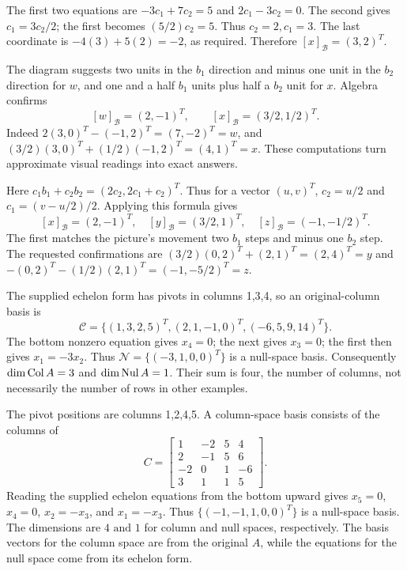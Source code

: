 The first two equations are $-3c_1+7c_2=5$ and $2c_1-3c_2=0$.
The second gives $c_1=3c_2/2$; the first becomes
$(5/2)c_2=5$. Thus $c_2=2,c_1=3$.
The last coordinate is $-4(3)+5(2)=-2$, as required.
Therefore $\boxed{[x]_{\mathcal B}=(3,2)^T}$.

The diagram suggests two units in the $b_1$ direction and minus one unit
in the $b_2$ direction for $w$, and one and a half $b_1$ units plus half
a $b_2$ unit for $x$. Algebra confirms
\[
 [w]_{\mathcal B}=(2,-1)^T,\qquad
 [x]_{\mathcal B}=(3/2,1/2)^T.
\]
Indeed $2(3,0)^T-(-1,2)^T=(7,-2)^T=w$, and
$(3/2)(3,0)^T+(1/2)(-1,2)^T=(4,1)^T=x$.
These computations turn approximate visual readings into exact answers.

Here $c_1b_1+c_2b_2=(2c_2,2c_1+c_2)^T$.
Thus for a vector $(u,v)^T$, $c_2=u/2$ and
$c_1=(v-u/2)/2$. Applying this formula gives
\[
 [x]_{\mathcal B}=(2,-1)^T,\quad
 [y]_{\mathcal B}=(3/2,1)^T,\quad
 [z]_{\mathcal B}=(-1,-1/2)^T.
\]
The first matches the picture's movement two $b_1$ steps and minus one
$b_2$ step. The requested confirmations are
$(3/2)(0,2)^T+(2,1)^T=(2,4)^T=y$ and
$-(0,2)^T-(1/2)(2,1)^T=(-1,-5/2)^T=z$.

The supplied echelon form has pivots in columns 1,3,4, so an original-column
basis is
\[
 \mathcal C=\{(1,3,2,5)^T,(2,1,-1,0)^T,(-6,5,9,14)^T\}.
\]
The bottom nonzero equation gives $x_4=0$; the next gives $x_3=0$;
the first then gives $x_1=-3x_2$. Thus
$\mathcal N=\{(-3,1,0,0)^T\}$ is a null-space basis.
Consequently $\dim\operatorname{Col} A=3$ and $\dim\operatorname{Nul} A=1$.
Their sum is four, the number of columns, not necessarily the number of rows
in other examples.

The pivot positions are columns 1,2,4,5. A column-space basis consists
of the columns of
\[
 C=\begin{bmatrix}1&-2&5&4\\2&-1&5&6\\-2&0&1&-6\\3&1&1&5\end{bmatrix}.
\]
Reading the supplied echelon equations from the bottom upward gives
$x_5=0$, $x_4=0$, $x_2=-x_3$, and $x_1=-x_3$.
Thus $\{(-1,-1,1,0,0)^T\}$ is a null-space basis.
The dimensions are $\boxed{4\text{ and }1}$ for column and null spaces,
respectively. The basis vectors for the column space are from the original
$A$, while the equations for the null space come from its echelon form.

